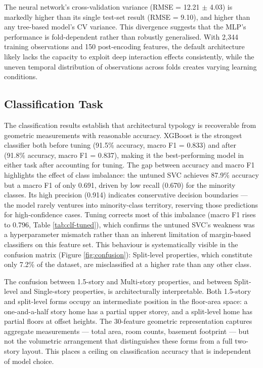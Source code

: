 \documentclass[11pt,a4paper]{article}
\begin{document}
The neural network's cross-validation variance (RMSE = 12.21 \(\pm\)
4.03) is markedly higher than its single test-set result (RMSE = 9.10),
and higher than any tree-based model's CV variance. This divergence
suggests that the MLP's performance is fold-dependent rather than
robustly generalised. With 2,344 training observations and 150
post-encoding features, the default architecture likely lacks the
capacity to exploit deep interaction effects consistently, while the
uneven temporal distribution of observations across folds creates
varying learning conditions.

\subsection{Classification Task}\label{classification-task}

The classification results establish that architectural typology is
recoverable from geometric measurements with reasonable accuracy.
XGBoost is the strongest classifier both before tuning (91.5\% accuracy,
macro F1 = 0.833) and after (91.8\% accuracy, macro F1 = 0.837), making
it the best-performing model in either task after accounting for tuning.
The gap between accuracy and macro F1 highlights the effect of class
imbalance: the untuned SVC achieves 87.9\% accuracy but a macro F1 of
only 0.691, driven by low recall (0.670) for the minority classes. Its
high precision (0.914) indicates conservative decision boundaries ---
the model rarely ventures into minority-class territory, reserving those
predictions for high-confidence cases. Tuning corrects most of this
imbalance (macro F1 rises to 0.796, Table \ref{tab:clf-tuned}), which
confirms the untuned SVC's weakness was a hyperparameter mismatch rather
than an inherent limitation of margin-based classifiers on this feature
set. This behaviour is systematically visible in the confusion matrix
(Figure \ref{fig:confusion}): Split-level properties, which constitute
only 7.2\% of the dataset, are misclassified at a higher rate than any
other class.

The confusion between 1.5-story and Multi-story properties, and between
Split-level and Single-story properties, is architecturally
interpretable. Both 1.5-story and split-level forms occupy an
intermediate position in the floor-area space: a one-and-a-half story
home has a partial upper storey, and a split-level home has partial
floors at offset heights. The 30-feature geometric representation
captures aggregate measurements --- total area, room counts, basement
footprint --- but not the volumetric arrangement that distinguishes
these forms from a full two-story layout. This places a ceiling on
classification accuracy that is independent of model choice.
\end{document}
